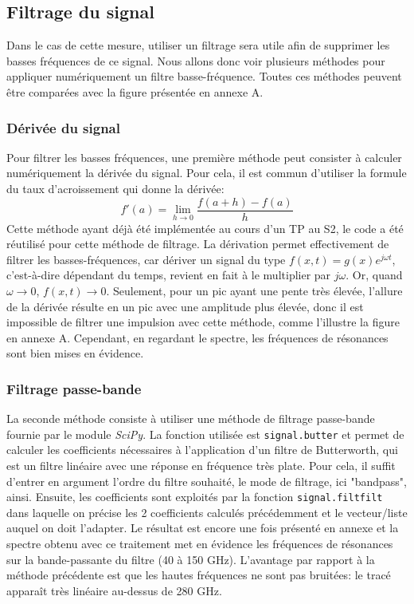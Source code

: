 \documentclass[a4paper, 11pt]{article}
\begin{document}
\subsection{Filtrage du signal}
Dans le cas de cette mesure, utiliser un filtrage sera utile afin de supprimer les basses fréquences de ce signal. Nous allons donc voir plusieurs méthodes pour appliquer numériquement un filtre basse-fréquence. Toutes ces méthodes peuvent être comparées avec la figure présentée en annexe A.

\subsubsection{Dérivée du signal}
Pour filtrer les basses fréquences, une première méthode peut consister à calculer numériquement la dérivée du signal. Pour cela, il est commun d'utiliser la formule du taux d'acroissement qui donne la dérivée:
\begin{equation}
	f'(a) = \lim_{h \rightarrow 0} \frac{f(a + h) - f(a)}{h}
\end{equation}
Cette méthode ayant déjà été implémentée au cours d'un TP au S2, le code a été réutilisé pour cette méthode de filtrage. La dérivation permet effectivement de filtrer les basses-fréquences, car dériver un signal du type $f(x, t) = g(x) e^{j \omega t}$, c'est-à-dire dépendant du temps, revient en fait à le multiplier par $j \omega$. Or, quand $\omega \rightarrow 0$, $f(x, t) \rightarrow 0$. Seulement, pour un pic ayant une pente très élevée, l'allure de la dérivée résulte en un pic avec une amplitude plus élevée, donc il est impossible de filtrer une impulsion avec cette méthode, comme l'illustre la figure en annexe A. Cependant, en regardant le spectre, les fréquences de résonances sont bien mises en évidence.

\subsubsection{Filtrage passe-bande}
La seconde méthode consiste à utiliser une méthode de filtrage passe-bande fournie par le module \textit{SciPy}. La fonction utilisée est \verb|signal.butter| et permet de calculer les coefficients nécessaires à l'application d'un filtre de Butterworth, qui est un filtre linéaire avec une réponse en fréquence très plate. Pour cela, il suffit d'entrer en argument l'ordre du filtre souhaité, le mode de filtrage, ici "bandpass", ainsi. Ensuite, les coefficients sont exploités par la fonction \verb|signal.filtfilt| dans laquelle on précise les 2 coefficients calculés précédemment et le vecteur/liste auquel on doit l'adapter. Le résultat est encore une fois présenté en annexe et la spectre obtenu avec ce traitement met en évidence les fréquences de résonances sur la bande-passante du filtre (40 à 150 GHz). L'avantage par rapport à la méthode précédente est que les hautes fréquences ne sont pas bruitées: le tracé apparaît très linéaire au-dessus de 280 GHz.
\end{document}
